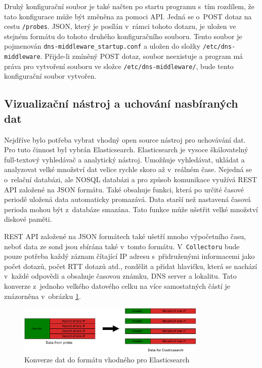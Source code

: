\documentclass[thesis=M,czech]{src/FITthesis}[2019/12/23]
\begin{document}
Druhý konfigurační soubor je také načten po startu programu s~tím \linebreak rozdílem, že tato konfigurace může být změněna za pomoci API. Jedná se o~POST dotaz na cestu \texttt{/probes}. JSON, který je posílán v~rámci tohoto dotazu, je uložen ve stejném formátu do tohoto druhého konfiguračního souboru. Tento soubor je pojmenován \texttt{dns-middleware\_startup.conf} a uložen do složky \texttt{/etc/dns-middleware}. Přijde-li zmíněný POST dotaz, soubor \linebreak neexistuje a program  má  práva pro vytvoření souboru ve složce \linebreak \texttt{/etc/dns-middleware/}, bude tento konfigurační soubor vytvořen. 



\subsection{Vizualizační nástroj a uchování nasbíraných dat}
\label{sec:vizualizationStorage}

Nejdříve bylo potřeba vybrat vhodný open source nástroj pro uchovávání dat. Pro tuto činnost byl vybrán Elasticsearch. Elasticsearch je vysoce škálovatelný full-textový vyhledávač a analytický nástroj. Umožňuje vyhledávat, ukládat a analyzovat velké množství dat velice rychle skoro až v~reálném čase. Nejedná se o~relační databázi, ale NOSQL databázi a pro způsob komunikace využívá REST API založené na JSON formátu. Také obsahuje funkci, která po určité časové periodě uložená data automaticky promazává. Data starší než nastavená časová perioda mohou být z~databáze smazána. Tato funkce může ušetřit velké množství diskové paměti. \cite{elastic}

REST API založené na JSON formátech také ušetří mnoho výpočetního času, neboť data ze sond jsou sbírána také v~tomto formátu. V~\texttt{Collectoru} bude pouze potřeba každý záznam čítající IP adresu s~přidruženými informacemi jako počet dotazů, počet RTT dotazů atd., rozdělit a přidat hlavičku, která se nachází v~každé odpovědi a obsahuje časovou známku, DNS server a lokalitu. Tato konverze z~jednoho velkého datového celku na více samostatných částí je znázorněna v~obrázku \ref{fig:dataConversion}. 

\begin{figure}[ht]
	\centering
	\includegraphics[width=0.8\textwidth]{images/data-conversion.pdf}
   \caption{Konverze dat do formátu vhodného pro Elasticsearch}
	\label{fig:dataConversion}
\end{figure}
\end{document}
